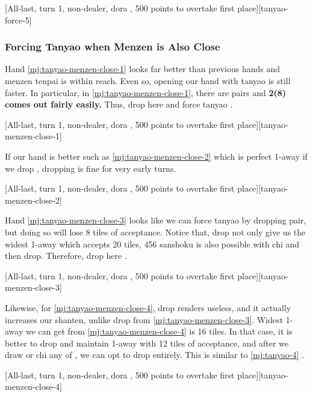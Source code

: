 \documentclass[12pt]{article}
\begin{document}
[All-last, turn 1, non-dealer, dora , 500 points to overtake first place][tanyao-force-5]


\subsubsection*{Forcing Tanyao when Menzen is Also Close}

Hand \ref{mj:tanyao-menzen-close-1} looks far better than previous hands and menzen tenpai is within reach. Even so, opening our hand with tanyao is still faster. In particular, in \ref{mj:tanyao-menzen-close-1}, there are  pairs and \textbf{2(8) comes out fairly easily.} Thus, drop  here and force tanyao \citep[][pp.~41--42]{kawamura-naki}.

[All-last, turn 1, non-dealer, dora , 500 points to overtake first place][tanyao-menzen-close-1]

If our hand is better such as \ref{mj:tanyao-menzen-close-2} which is perfect 1-away if we drop , dropping  is fine for very early turns.

[All-last, turn 1, non-dealer, dora , 500 points to overtake first place][tanyao-menzen-close-2]

Hand \ref{mj:tanyao-menzen-close-3} looks like we can force tanyao by dropping  pair, but doing so will lose  8 tiles of acceptance. Notice that,  drop not only give us the widest 1-away which accepts  20 tiles, 456 sanshoku is also possible with  chi and then  drop. Therefore, drop  here \citep[][pp.~43--44]{kawamura-naki}.

[All-last, turn 1, non-dealer, dora , 500 points to overtake first place][tanyao-menzen-close-3]

Likewise, for \ref{mj:tanyao-menzen-close-4},  drop renders  useless, and it actually increases our shanten, unlike  drop from \ref{mj:tanyao-menzen-close-3}. Widest 1-away we can get from \ref{mj:tanyao-menzen-close-4} is 16 tiles. In that case, it is better to drop  and maintain 1-away with 12 tiles of acceptance, and after we draw or chi any of , we can opt to drop  entirely. This is similar to \ref{mj:tanyao-4} \citep[][pp.~43--44]{kawamura-naki}.

[All-last, turn 1, non-dealer, dora , 500 points to overtake first place][tanyao-menzen-close-4]
\end{document}

